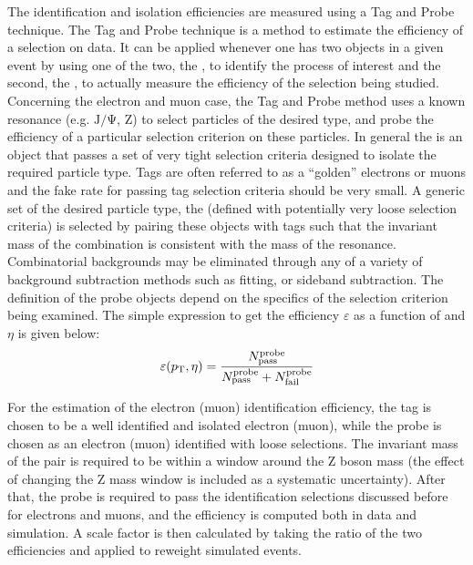 The identification and isolation efficiencies are measured using a Tag and Probe technique. 
The Tag and Probe technique is a method to estimate the efficiency of a selection on data. It can be applied whenever one has two objects in a given event by using one of the two, the \tg{}, to identify the process of interest and the second, the \probe{}, to actually measure the efficiency of the selection being studied.
Concerning the electron and muon case, the Tag and Probe method uses a known resonance (e.g. $\mathrm{J/\Psi}$, Z) to select particles of the desired type, and probe the efficiency of a particular selection criterion on these particles. In general the \tg{} is an object that passes a set of very tight selection criteria designed to isolate the required particle type. Tags are often referred to as a ``golden'' electrons or muons and the fake rate for passing tag selection criteria should be very small. A generic set of the desired particle type, the \probe{} (defined with potentially very loose selection criteria) is selected by pairing these objects with tags such that the invariant mass of the combination is consistent with the mass of the resonance. Combinatorial backgrounds may be eliminated through any of a variety of background subtraction methods such as fitting, or sideband subtraction. The definition of the probe objects depend on the specifics of the selection criterion being examined. The simple expression to get the efficiency $\varepsilon$ as a function of \pt and $\eta$ is given below:
\begin{equation}\label{eq:tagprobe}
\varepsilon(p_\mathrm{T},\eta) = \frac{ N^\mathrm{probe}_\mathrm{pass}}{N^\mathrm{probe}_\mathrm{pass} + N^\mathrm{probe}_\mathrm{fail}}
\end{equation}

For the estimation of the electron (muon) identification efficiency, the tag is chosen to be a well identified and isolated electron (muon), while the probe is chosen as an electron (muon) identified with loose selections. The invariant mass of the \tp pair is required to be within a window around the Z boson mass (the effect of changing the Z mass window is included as a systematic uncertainty). After that, the probe is required to pass the identification selections discussed before for electrons and muons, and the efficiency is computed both in data and simulation. A scale factor is then calculated by taking the ratio of the two efficiencies and applied to reweight simulated events.

